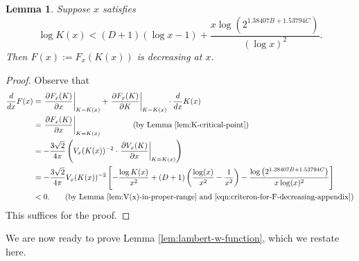 \documentclass[11pt,letterpaper,reqno]{amsart}
\newtheorem{lemma}[theorem]{Lemma}
\theoremstyle{definition}
\numberwithin{equation}{section}
\numberwithin{figure}{section}
\numberwithin{table}{section}
\newcommand{\lrb}[1]{\left[#1\right]}
\begin{document}
\begin{lemma}\label{lem:criterion-for-F-decreasing}
    Suppose $x$ satisfies
    \begin{equation}
            \log K(x) < (D + 1) \left( \log x - 1 \right) + \frac{x \log\left( 2^{1.38407B +  1.53794C} \right)}{\left( \log x \right)^2}. 
            \label{eqn:criteron-for-F-decreasing-appendix}
        \end{equation}
    Then $F(x) := F_x(K(x))$ is decreasing at $x$.
\end{lemma}

\begin{proof}
        Observe that
        \begin{align}
            \frac{d}{dx}F(x) 
            &= \left. \frac{\partial F_{x}(K)}{\partial x} \right|_{K = K(x)} + \left. \frac{\partial F_x(K)}{\partial K} \right|_{K = K(x)} \cdot \frac{d}{dx} K(x) \\
            &= \left. \frac{\partial F_{x}(K)}{\partial x} \right|_{K = K(x)} 
            \qquad\qquad \text{(by Lemma \ref{lem:K-critical-point})}
            \\
            &= - \frac{3\sqrt{2}}{4\pi} \left( V_x(K(x))^{-2} \cdot \left.\frac{\partial V_x(K)}{\partial x} \right|_{K = K(x)}\right) \\
            &= 
            - \frac{3\sqrt{2}}{4\pi} V_x(K(x))^{-2} 
            \lrb{
                - \frac{\log K(x)}{x^2} + (D + 1)\left( \frac{\log(x)}{x^2} - \frac{1}{x^2}  \right) - \frac{\log \left( 2^{1.38407 B + 1.53794 C}  \right)}{x \log(x)^2}
            } \\
            &< 0. \qquad \text{(by Lemma \ref{lem:V(x)-in-proper-range} and \eqref{eqn:criteron-for-F-decreasing-appendix})}
        \end{align} 
    This suffices for the proof.
\end{proof}

We are now ready to prove Lemma \ref{lem:lambert-w-function}, which we restate here.
\end{document}
